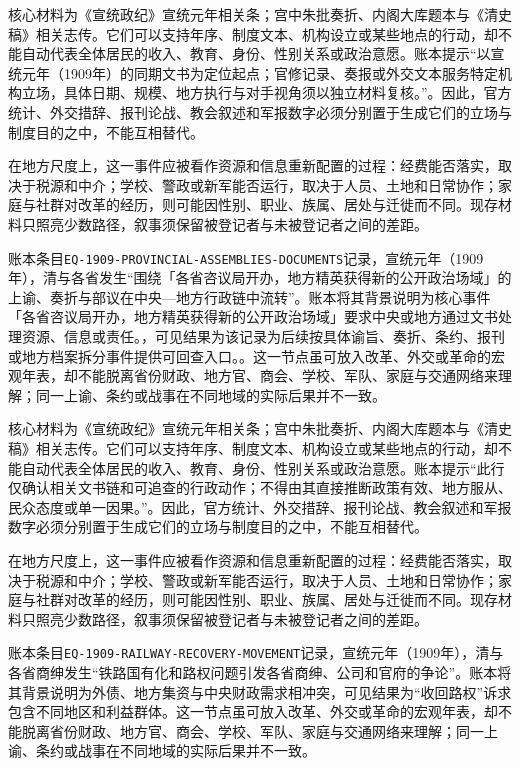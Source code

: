 核心材料为《宣统政纪》宣统元年相关条；宫中朱批奏折、内阁大库题本与《清史稿》相关志传。它们可以支持年序、制度文本、机构设立或某些地点的行动，却不能自动代表全体居民的收入、教育、身份、性别关系或政治意愿。账本提示“以宣统元年（1909年）的同期文书为定位起点；官修记录、奏报或外交文本服务特定机构立场，具体日期、规模、地方执行与对手视角须以独立材料复核。”。因此，官方统计、外交措辞、报刊论战、教会叙述和军报数字必须分别置于生成它们的立场与制度目的之中，不能互相替代。

在地方尺度上，这一事件应被看作资源和信息重新配置的过程：经费能否落实，取决于税源和中介；学校、警政或新军能否运行，取决于人员、土地和日常协作；家庭与社群对改革的经历，则可能因性别、职业、族属、居处与迁徙而不同。现存材料只照亮少数路径，叙事须保留被登记者与未被登记者之间的差距。

账本条目\texttt{EQ-1909-PROVINCIAL-ASSEMBLIES-DOCUMENTS}记录，宣统元年（1909年），清与各省发生“围绕「各省咨议局开办，地方精英获得新的公开政治场域」的上谕、奏折与部议在中央—地方行政链中流转”。账本将其背景说明为核心事件「各省咨议局开办，地方精英获得新的公开政治场域」要求中央或地方通过文书处理资源、信息或责任。，可见结果为该记录为后续按具体谕旨、奏折、条约、报刊或地方档案拆分事件提供可回查入口。。这一节点虽可放入改革、外交或革命的宏观年表，却不能脱离省份财政、地方官、商会、学校、军队、家庭与交通网络来理解；同一上谕、条约或战事在不同地域的实际后果并不一致。

核心材料为《宣统政纪》宣统元年相关条；宫中朱批奏折、内阁大库题本与《清史稿》相关志传。它们可以支持年序、制度文本、机构设立或某些地点的行动，却不能自动代表全体居民的收入、教育、身份、性别关系或政治意愿。账本提示“此行仅确认相关文书链和可追查的行政动作；不得由其直接推断政策有效、地方服从、民众态度或单一因果。”。因此，官方统计、外交措辞、报刊论战、教会叙述和军报数字必须分别置于生成它们的立场与制度目的之中，不能互相替代。

在地方尺度上，这一事件应被看作资源和信息重新配置的过程：经费能否落实，取决于税源和中介；学校、警政或新军能否运行，取决于人员、土地和日常协作；家庭与社群对改革的经历，则可能因性别、职业、族属、居处与迁徙而不同。现存材料只照亮少数路径，叙事须保留被登记者与未被登记者之间的差距。

账本条目\texttt{EQ-1909-RAILWAY-RECOVERY-MOVEMENT}记录，宣统元年（1909年），清与各省商绅发生“铁路国有化和路权问题引发各省商绅、公司和官府的争论”。账本将其背景说明为外债、地方集资与中央财政需求相冲突，可见结果为“收回路权”诉求包含不同地区和利益群体。这一节点虽可放入改革、外交或革命的宏观年表，却不能脱离省份财政、地方官、商会、学校、军队、家庭与交通网络来理解；同一上谕、条约或战事在不同地域的实际后果并不一致。

